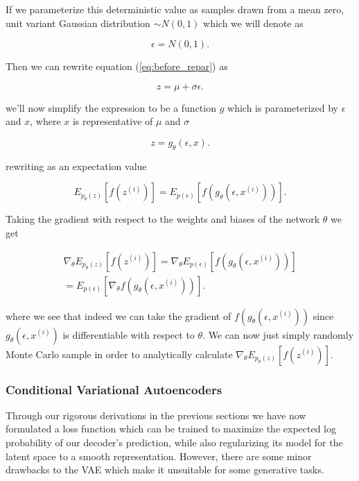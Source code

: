 If we parameterize this deterministic value as samples drawn 
from a mean zero, unit variant Gaussian distribution 
$\sim N(0, 1)$ which we will denote as 

\begin{equation}
    \epsilon = N(0, 1).
\end{equation}

Then we can rewrite equation (\ref{eq:before_repar}) as 

\begin{equation}
    z = \mu + \sigma \epsilon.
\end{equation}

we'll now simplify the expression to be a function 
$g$ which is parameterized by $\epsilon$ and $x$, 
where $x$ is representative of $\mu$ and $\sigma$

\begin{equation}
    z = g_{\theta}(\epsilon, x).
\end{equation}

rewriting as an expectation value 

\begin{equation}
    E_{p_{\theta}(z)}[f(z^{(i)})] = E_{p(\epsilon)}[
    f(g_{\theta}(\epsilon, x^{(i)}))].
\end{equation}

Taking the gradient with respect to the weights 
and biases of the network $\theta$ we get 

\begin{align*}
    \nabla_{\theta} E_{p_{\theta}(z)}[f(z^{(i)})] = \nabla_{\theta} E_{p(\epsilon)}[
    f(g_{\theta}(\epsilon, x^{(i)}))]\\
    = E_{p(\epsilon)}[ \nabla_{\theta}
    f(g_{\theta}(\epsilon, x^{(i)}))].
\end{align*}

where we see that indeed we can take the gradient 
of $f(g_{\theta}(\epsilon, x^{(i)}))$ since 
$g_{\theta}(\epsilon, x^{(i)})$ is differentiable 
with respect to $\theta$. We can now just simply 
randomly Monte Carlo sample in order to analytically 
calculate $\nabla_{\theta} E_{p_{\theta}(z)}[f(z^{(i)})]$.

%
%
\subsubsection{Conditional Variational Autoencoders}

Through our rigorous derivations in the previous sections 
we have now formulated a loss function which can be trained 
to maximize the expected log probability of our 
decoder's prediction, while also regularizing its
model for the latent space to a smooth representation. 
However, there are some minor drawbacks to the \ac{VAE} 
which make it unsuitable for some generative tasks. 

